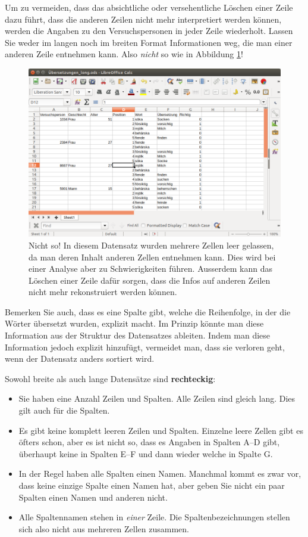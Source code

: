 \documentclass[oneside, 10pt]{book}\usepackage[]{graphicx}\usepackage[]{xcolor}
\begin{document}
Um zu vermeiden, dass das absichtliche oder versehentliche Löschen
einer Zeile dazu führt, dass die anderen Zeilen nicht mehr
interpretiert werden können, werden die Angaben zu den Versuchspersonen
in jeder Zeile wiederholt. Lassen Sie weder im langen noch im
breiten Format Informationen weg, die man einer anderen
Zeile entnehmen kann. Also \emph{nicht} so wie in Abbildung \ref{fig:leere_zellen}!

\begin{figure}[tp]
\includegraphics[width = \textwidth]{figs/long_data_nicht_so.png}
\caption{Nicht so! In diesem Datensatz wurden mehrere Zellen leer gelassen, da man deren
Inhalt anderen Zellen entnehmen kann. Dies wird bei einer Analyse aber zu Schwierigkeiten führen. Ausserdem kann das Löschen einer Zeile dafür sorgen,
dass die Infos auf anderen Zeilen nicht mehr rekonstruiert werden können.}
\label{fig:leere_zellen}
\end{figure}

Bemerken Sie auch, dass es eine Spalte gibt, welche die Reihenfolge,
in der die Wörter übersetzt wurden, explizit macht. Im Prinzip könnte
man diese Information aus der Struktur des Datensatzes ableiten.
Indem man diese Information jedoch explizit hinzufügt, vermeidet man,
dass sie verloren geht, wenn der Datensatz anders sortiert wird.

Sowohl breite als auch lange Datensätze sind \textbf{rechteckig}:
\begin{itemize}
\item Sie haben eine Anzahl Zeilen und Spalten. Alle Zeilen sind gleich lang. Dies gilt auch für die Spalten.
\item Es gibt keine komplett leeren Zeilen und Spalten. Einzelne leere Zellen
gibt es öfters schon, aber es ist nicht so, dass es Angaben in Spalten A--D
gibt, überhaupt keine in Spalten E--F und dann wieder welche in Spalte G.
\item In der Regel haben alle Spalten einen Namen. Manchmal kommt es zwar vor,
dass keine einzige Spalte einen Namen hat, aber geben Sie nicht ein paar Spalten
einen Namen und anderen nicht.
\item Alle Spaltennamen stehen in \emph{einer} Zeile. Die Spaltenbezeichnungen stellen
sich also nicht aus mehreren Zellen zusammen.
\end{itemize}
\end{document}
